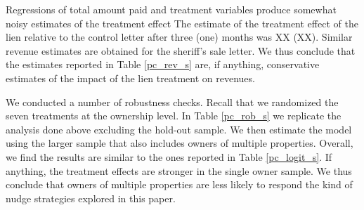 \documentclass[12pt]{article}
\begin{document}
Regressions of total amount paid and treatment variables produce somewhat noisy estimates of the treatment effect
The estimate of the treatment effect of the lien relative to the control letter after three (one) months was XX (XX). Similar  revenue estimates are obtained for the sheriff's sale letter.  We thus conclude that  the estimates reported in Table \ref{pc_rev_s} are, if anything, conservative estimates of the impact of the lien treatment on revenues.

We conducted a number of robustness checks. Recall that we randomized the seven treatments at the ownership level. In Table \ref{pc_rob_s} we replicate the analysis done above excluding the hold-out sample. We then estimate the model using the larger sample that also includes owners of multiple properties. Overall, we find the results
are similar to the ones reported in Table \ref{pc_logit_s}. If anything, the treatment effects are stronger in the single owner sample. We thus conclude that owners of multiple properties are less likely to respond the kind of nudge strategies explored in this paper.
\end{document}
